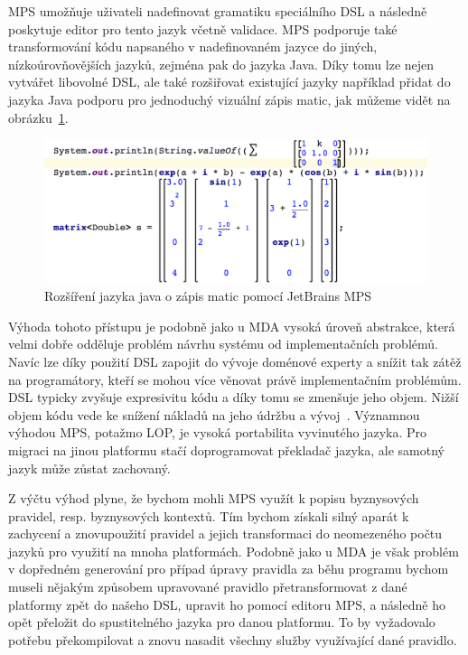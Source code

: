 MPS umožňuje uživateli nadefinovat gramatiku speciálního \gls{DSL} a následně poskytuje
editor pro tento jazyk včetně validace. MPS podporuje také transformování kódu napsaného
v nadefinovaném jazyce do jiných, nízkoúrovňovějších jazyků, zejména pak do jazyka Java.
Díky tomu lze nejen vytvářet libovolné \gls{DSL}, ale také rozšiřovat existující
jazyky \textendash\xspace například přidat do jazyka Java podporu pro jednoduchý vizuální
zápis matic, jak můžeme vidět na obrázku~\ref{fig:java-matrix}.

\begin{figure}[t]
    \centering
    \includegraphics[keepaspectratio=true, width=0.7\linewidth]{figures/java-matrix.png}
    \caption{Rozšíření jazyka java o zápis matic pomocí JetBrains MPS~\cite{jetbrainsmps}}
    \label{fig:java-matrix}
\end{figure}

Výhoda tohoto přístupu je podobně jako u \gls{MDA} vysoká úroveň abstrakce, která
velmi dobře odděluje problém návrhu systému od implementačních problémů.
Navíc lze díky použití \gls{DSL} zapojit do vývoje doménové experty a snížit tak
zátěž na programátory, kteří se mohou více věnovat právě implementačním problémům.
\gls{DSL} typicky zvyšuje expresivitu kódu a díky tomu se zmenšuje jeho objem.
Nižší objem kódu vede ke snížení nákladů na jeho údržbu a vývoj~\cite{littman1987mental}\cite{soloway1986empirical}.
Významnou výhodou MPS, potažmo \gls{LOP}, je vysoká portabilita vyvinutého jazyka.
Pro migraci na jinou platformu stačí doprogramovat překladač jazyka, ale
samotný jazyk může zůstat zachovaný.

Z výčtu výhod plyne, že bychom mohli MPS využít k popisu byznysových pravidel,
resp. byznysových kontextů. Tím bychom získali silný aparát k zachycení a
znovupoužití pravidel a jejich transformaci do neomezeného počtu jazyků pro
využití na mnoha platformách. Podobně jako u \gls{MDA} je však problém v dopředném
generování \textendash\xspace pro případ úpravy pravidla za běhu programu bychom museli
nějakým způsobem upravované pravidlo přetransformovat z dané platformy zpět
do našeho \gls{DSL}, upravit ho pomocí editoru MPS, a následně ho opět přeložit
do spustitelného jazyka pro danou platformu. To by vyžadovalo potřebu překompilovat
a znovu nasadit všechny služby využívající dané pravidlo.

